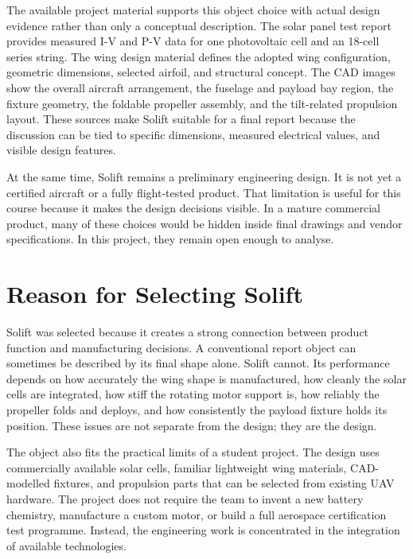 The available project material supports this object choice with actual design evidence rather than only a conceptual description. The solar panel test report provides measured I-V and P-V data for one photovoltaic cell and an 18-cell series string. The wing design material defines the adopted wing configuration, geometric dimensions, selected airfoil, and structural concept. The CAD images show the overall aircraft arrangement, the fuselage and payload bay region, the fixture geometry, the foldable propeller assembly, and the tilt-related propulsion layout. These sources make Solift suitable for a final report because the discussion can be tied to specific dimensions, measured electrical values, and visible design features.

At the same time, Solift remains a preliminary engineering design. It is not yet a certified aircraft or a fully flight-tested product. That limitation is useful for this course because it makes the design decisions visible. In a mature commercial product, many of these choices would be hidden inside final drawings and vendor specifications. In this project, they remain open enough to analyse.

\section{Reason for Selecting Solift}
\label{subsec:selection-reason}

Solift was selected because it creates a strong connection between product function and manufacturing decisions. A conventional report object can sometimes be described by its final shape alone. Solift cannot. Its performance depends on how accurately the wing shape is manufactured, how cleanly the solar cells are integrated, how stiff the rotating motor support is, how reliably the propeller folds and deploys, and how consistently the payload fixture holds its position. These issues are not separate from the design; they are the design.

The object also fits the practical limits of a student project. The design uses commercially available solar cells, familiar lightweight wing materials, CAD-modelled fixtures, and propulsion parts that can be selected from existing UAV hardware. The project does not require the team to invent a new battery chemistry, manufacture a custom motor, or build a full aerospace certification test programme. Instead, the engineering work is concentrated in the integration of available technologies.


